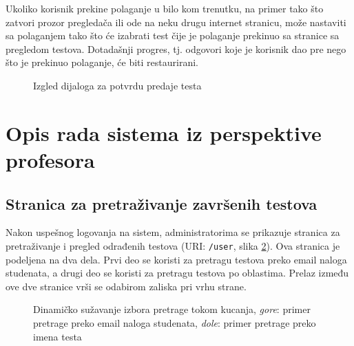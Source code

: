 Ukoliko korisnik prekine polaganje u bilo kom trenutku, na primer tako što zatvori prozor pregledača ili ode na neku drugu internet stranicu, može nastaviti sa polaganjem tako što će izabrati test čije je polaganje prekinuo sa stranice sa pregledom testova. Dotadašnji progres, tj. odgovori koje je korisnik dao pre nego što je prekinuo polaganje, će biti restaurirani.
\begin{figure}[h]
\centering
{}
\caption{Izgled dijaloga za potvrdu predaje testa}
\label{fig:task-submit}
\end{figure}

\section{Opis rada sistema iz perspektive profesora}
\subsection{Stranica za pretraživanje završenih testova}
Nakon uspešnog logovanja na sistem, administratorima se prikazuje stranica za pretraživanje i pregled odrađenih testova (URI: \texttt{/user}, slika \ref{fig:assignments-admin}). Ova stranica je podeljena na dva dela. Prvi deo se koristi za pretragu testova preko email naloga studenata, a drugi deo se koristi za pretragu testova po oblastima. Prelaz između ove dve stranice vrši se odabirom zaliska pri vrhu strane.

\begin{figure}[h]
\centering
{}
\caption{Dinamičko sužavanje izbora pretrage tokom kucanja, \textit{gore}: primer pretrage preko email naloga studenata, \textit{dole}: primer pretrage preko imena testa}
\label{fig:assignments-admin}
\end{figure}

